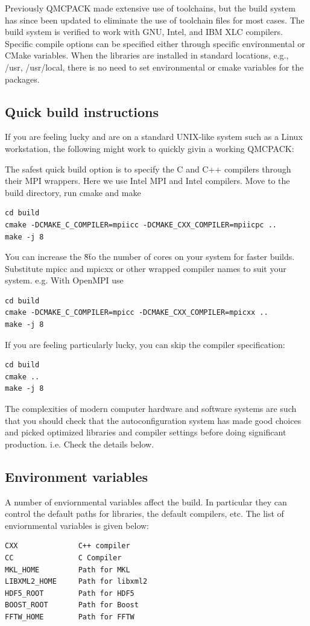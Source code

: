 Previously QMCPACK made extensive use of toolchains, but the build system
has since been updated to eliminate the use of toolchain files for
most cases.  The build system is verified to work with GNU, Intel, and IBM XLC
compilers.  Specific compile options can be specified either through
specific environmental or CMake variables.  When the libraries are
installed in standard locations, e.g., /usr, /usr/local, there is no
need to set environmental or cmake variables for the packages.

\subsection{Quick build instructions}
\label{sec:cmakequick}

If you are feeling lucky and are on a standard UNIX-like system such
as a Linux workstation, the following might work to quickly givin a
working QMCPACK:

The safest quick build option is to specify the C and C++ compilers
through their MPI wrappers. Here we use Intel MPI and Intel
compilers. Move to the build directory, run cmake and make
\begin{verbatim}
cd build
cmake -DCMAKE_C_COMPILER=mpiicc -DCMAKE_CXX_COMPILER=mpiicpc ..
make -j 8
\end{verbatim}
You can increase the \"8\" to the number of cores on your system for
faster builds. Substitute mpicc and mpicxx or other wrapped compiler names to suit
  your system. e.g. With OpenMPI use
\begin{verbatim}
cd build
cmake -DCMAKE_C_COMPILER=mpicc -DCMAKE_CXX_COMPILER=mpicxx ..
make -j 8
\end{verbatim}

If you are feeling particularly lucky, you can skip the compiler specification:
\begin{verbatim}
cd build
cmake ..
make -j 8
\end{verbatim}

The complexities of modern computer hardware and software systems are
such that you should check that the autoconfiguration system has made
good choices and picked optimized libraries and compiler settings
before doing significant production. i.e. Check the details below.

\subsection{Environment variables}
A number of enviornmental variables affect the build.  In particular
they can control the default paths for libraries, the default
compilers, etc.  The list of enviornmental variables is given below:
\begin{verbatim}
CXX              C++ compiler
CC               C Compiler
MKL_HOME         Path for MKL
LIBXML2_HOME     Path for libxml2
HDF5_ROOT        Path for HDF5
BOOST_ROOT       Path for Boost
FFTW_HOME        Path for FFTW
\end{verbatim}

